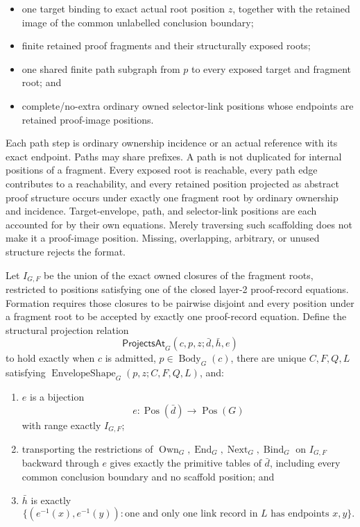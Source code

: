 \documentclass[11pt,twoside]{article}
\newcommand{\ProjectsAt}{\mathsf{ProjectsAt}}
\begin{document}
\begin{itemize}[leftmargin=2em]
  \item one target binding to exact actual root position \(z\), together with the
        retained image of the common unlabelled conclusion boundary;
  \item finite retained proof fragments and their structurally exposed roots;
  \item one shared finite path subgraph from \(p\) to every exposed target and
        fragment root; and
  \item complete/no-extra ordinary owned selector-link positions whose endpoints
        are retained proof-image positions.
\end{itemize}

Each path step is ordinary ownership incidence or an actual reference with its
exact endpoint.  Paths may share prefixes.  A path is not duplicated for internal
positions of a fragment.  Every exposed root is reachable, every path edge
contributes to a reachability, and every retained position projected as abstract
proof structure occurs under exactly one fragment root by ordinary ownership and
incidence.  Target-envelope, path, and selector-link positions are each accounted
for by their own equations.  Merely traversing such scaffolding does not make it a
proof-image position.  Missing, overlapping, arbitrary, or unused structure
rejects the format.

Let \(I_{G,F}\) be the union of the exact owned closures of the fragment roots,
restricted to positions satisfying one of the closed layer-2 proof-record
equations.  Formation requires those closures to be pairwise disjoint and every
position under a fragment root to be accepted by exactly one proof-record
equation.  Define the structural projection relation
\[
  \ProjectsAt_G(c,p,z;\bar d,\bar h,e)
\]
to hold exactly when \(c\) is admitted, \(p\in\operatorname{Body}_G(c)\), there
are unique \(C,F,Q,L\) satisfying \(\operatorname{EnvelopeShape}_G(p,z;C,F,Q,L)\),
and:

\begin{enumerate}[leftmargin=2.2em]
  \item \(e\) is a bijection
\[
  e:\operatorname{Pos}(\bar d)\longrightarrow\operatorname{Pos}(G)
\]
        with range exactly \(I_{G,F}\);
  \item transporting the restrictions of
        \(\operatorname{Own}_G,\operatorname{End}_G,
        \operatorname{Next}_G,\operatorname{Bind}_G\) on \(I_{G,F}\) backward
        through \(e\) gives exactly the primitive tables of \(\bar d\), including
        every common conclusion boundary and no scaffold position; and
  \item \(\bar h\) is exactly
        \[
          \{(e^{-1}(x),e^{-1}(y)):
             \text{one and only one link record in }L
             \text{ has endpoints }x,y\}.
        \]
\end{enumerate}
\end{document}
